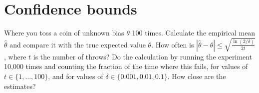 \documentclass[twoside,a4paper]{article}
\begin{document}
\section{Confidence bounds}
\label{sec:orge0a9612}
Where you toss a coin of unkn\mrk{}own bias \(\theta\) 100 times. Calculate the empirical mean \(\hat{\theta}\) and compare it with the true expected value \(\theta\).
How often is \(|\hat{\theta} - \theta| \leq \sqrt{\frac{\ln(2/\delta)}{2t}}\), where \(t\) is the number of throws?
Do the calculation by running the exper\mrk{}iment 10,000 times and counting the fraction of the time where this fails, for values of $t \in  \{1, \ldots, 100\}$, and for values of $\delta \in \{0.001, 0.01, 0.1\}$. How close are the estimates?
\end{document}
